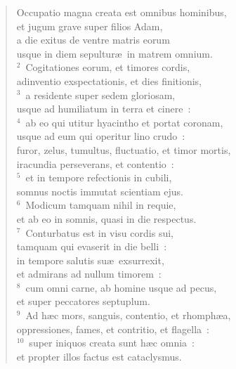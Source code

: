 \begin{flushleft}\begin{verse}\vspace{-19pt}\hspace{6pt}Occupatio magna creata est omnibus hominibus,\\\hspace{6pt} et jugum grave super filios Adam,\\ a die exitus de ventre matris eorum\\ usque in diem sepultur\ae\ in matrem omnium.\\
${}^{2}$~Cogitationes eorum, et timores cordis,\\ adinventio exspectationis, et dies finitionis,\\
${}^{3}$~a residente super sedem gloriosam,\\ usque ad humiliatum in terra et cinere~:\\
${}^{4}$~ab eo qui utitur hyacintho et portat coronam,\\ usque ad eum qui operitur lino crudo~:\\ furor, zelus, tumultus, fluctuatio, et timor mortis,\\ iracundia perseverans, et contentio~:\\
${}^{5}$~et in tempore refectionis in cubili,\\ somnus noctis immutat scientiam ejus.\\
${}^{6}$~Modicum tamquam nihil in requie,\\ et ab eo in somnis, quasi in die respectus.\\
${}^{7}$~Conturbatus est in visu cordis sui,\\ tamquam qui evaserit in die belli~:\\ in tempore salutis su\ae\ exsurrexit,\\ et admirans ad nullum timorem~:\\
${}^{8}$~cum omni carne, ab homine usque ad pecus,\\ et super peccatores septuplum.\\
${}^{9}$~Ad h\ae c mors, sanguis, contentio, et rhomph\ae a,\\ oppressiones, fames, et contritio, et flagella~:\\
${}^{10}$~super iniquos creata sunt h\ae c omnia~:\\ et propter illos factus est cataclysmus.\end{verse}\end{flushleft}


